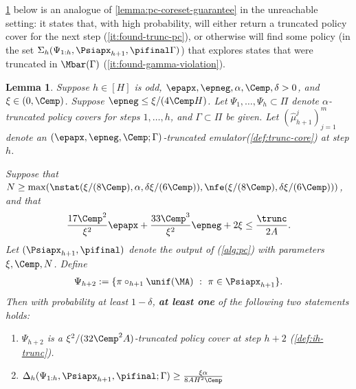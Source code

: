 \documentclass[11pt, oneside]{article}
\theoremstyle{plain}
\newtheorem{lemma}[theorem]{Lemma}
\theoremstyle{definition}
\numberwithin{theorem}{section}
\newcommand{\trunccore}{truncated emulator\xspace}
\renewcommand{\^}[1]{^{(#1)}}
\begin{document}
\cref{lem:pc-induction-trunc} below is an analogue of \cref{lemma:pc-coreset-guarantee} in the unreachable setting: it states that, with high probability, \PC will either return a truncated policy cover for the next step (\cref{it:found-trunc-pc}), or otherwise will find some policy (in the set $\Sigma_h(\Psi_{1:h}, \Psiapx_{h+1}, \pifinal \Gamma)$) that explores states that were truncated in $\Mbar(\Gamma)$  (\cref{it:found-gamma-violation}).
\begin{lemma}
  \label{lem:pc-induction-trunc}
  Suppose $h \in [H]$ is odd, $\epapx, \epneg, \alpha, \Cemp, \delta > 0$, and $\xi \in (0, \Cemp)$. Suppose $\epneg \leq \xi/(4\Cemp H)$. %
  Let $\Psi_1, \ldots, \Psi_h \subset \Pi$ denote $\alpha$-truncated policy covers for steps $1,\dots,h$, and $\Gamma \subset \Pi$ be given. Let $(\hat \mu_{h+1}^j)_{j=1}^m$ denote an $(\epapx, \epneg, \Cemp; \Gamma)$-\trunccore (\cref{def:trunc-core}) at step $h$.

  Suppose that $N \geq \max(\nstat(\xi/(8\Cemp), \alpha, \delta\xi/(6\Cemp)), \nfe(\xi/(8\Cemp), \delta\xi/(6\Cemp)))$, and that
  \begin{align}
 \frac{17\Cemp^2}{\xi^2}\epapx + \frac{33\Cemp^3}{\xi^2} \epneg + {2}\xi \leq \frac{\trunc}{2A}.\label{eq:trunc-param-constraint}
  \end{align}
  Let $(\Psiapx_{h+1}, \pifinal)$ denote the output of \PC (\cref{alg:pc}) with parameters $\xi, \Cemp, N$. Define
  \begin{align}
\Psi_{h+2} := \{ \pi \circ_{h+1} \unif(\MA) \ : \ \pi \in \Psiapx_{h+1} \}.\label{eq:define-psih2-lemma}
  \end{align}
  Then with probability at least $1-\delta$, \textbf{at least one} of the following two statements holds:
  \begin{enumerate}[label=(\alph*)]
  \item \label{it:found-trunc-pc} $\Psi_{h+2}$ is a $\xi^2/(32\Cemp^2 A)$-truncated policy cover at step $h+2$ (\cref{def:ih-trunc}). 
  \item \label{it:found-gamma-violation} $\Delta_h(\Psi_{1:h},\Psiapx_{h+1},\pifinal; \Gamma) \geq \frac{\xi \alpha}{8AH^2 \Cemp}$
  
  
  \end{enumerate}
\end{lemma}
\end{document}
